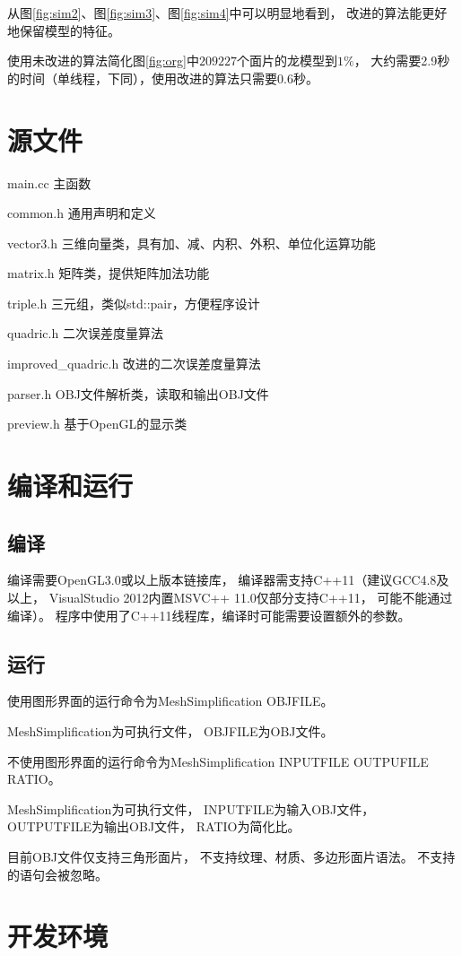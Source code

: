 从图\ref{fig:sim2}、图\ref{fig:sim3}、图\ref{fig:sim4}中可以明显地看到，%
改进的算法能更好地保留模型的特征。

使用未改进的算法简化图\ref{fig:org}中$209227$个面片的龙模型到$1\%$，%
大约需要2.9秒的时间（单线程，下同），使用改进的算法只需要0.6秒。

\section{源文件}
main.cc 主函数

common.h 通用声明和定义

vector3.h 三维向量类，具有加、减、内积、外积、单位化运算功能

matrix.h 矩阵类，提供矩阵加法功能

triple.h 三元组，类似std::pair，方便程序设计

quadric.h 二次误差度量算法

improved\_quadric.h 改进的二次误差度量算法

parser.h OBJ文件解析类，读取和输出OBJ文件

preview.h 基于OpenGL的显示类

\section{编译和运行}
\subsection{编译}
编译需要OpenGL3.0或以上版本链接库，%
编译器需支持C++11（建议GCC4.8及以上，%
VisualStudio 2012内置MSVC++ 11.0仅部分支持C++11，%
可能不能通过编译）。%
程序中使用了C++11线程库，编译时可能需要设置额外的参数。%

\subsection{运行}
使用图形界面的运行命令为MeshSimplification OBJFILE。

MeshSimplification为可执行文件，%
OBJFILE为OBJ文件。

不使用图形界面的运行命令为MeshSimplification INPUTFILE OUTPUFILE RATIO。

MeshSimplification为可执行文件，%
INPUTFILE为输入OBJ文件，%
OUTPUTFILE为输出OBJ文件，%
RATIO为简化比。

目前OBJ文件仅支持三角形面片，%
不支持纹理、材质、多边形面片语法。%
不支持的语句会被忽略。

\section{开发环境}

